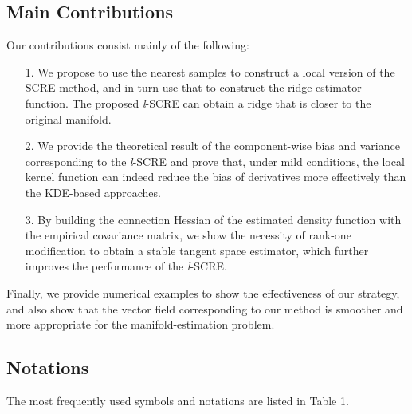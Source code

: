 \documentclass[aos,preprint]{imsart}
\theoremstyle{remark}
\begin{document}
 \subsection{Main Contributions}
Our contributions consist mainly of the following:
\begin{itemize}
\item[1.] We propose to use the nearest samples to construct a local version of the SCRE method, and in turn use that to construct the ridge-estimator function. The proposed {\it l}-SCRE  can obtain a ridge that is closer to the original manifold.
\item[2.] We provide the theoretical result of the component-wise bias and variance corresponding to the {\it l}-SCRE and prove that, under mild conditions, the local kernel function can indeed reduce the bias of derivatives more effectively than the KDE-based approaches.
\item[3.] By building the connection Hessian of the estimated density function with the empirical covariance matrix, we show the necessity of rank-one modification to obtain a stable tangent space estimator, which further improves the performance of the {\it l}-SCRE.
\end{itemize}
Finally, we provide numerical examples to show the effectiveness of our strategy, and also show that the vector field corresponding to our method is smoother and more appropriate for the manifold-estimation problem.
\subsection{Notations}
The most frequently used symbols and notations are listed in Table 1.%
\end{document}
